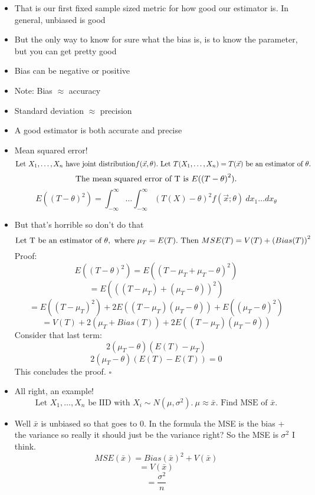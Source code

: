 \documentclass{article}
\begin{document}
\begin{itemize}
\[      \] 
    \item That is our first fixed sample sized metric for how good our estimator is. In general, unbiased is good
    \item But the only way to know for sure what the bias is, is to know the parameter, but you can get pretty good
    \item Bias can be negative or positive
    \item Note: Bias $ \approx $ accuracy
    \item Standard deviation  $ \approx $ precision
    \item A good estimator is both accurate and precise
    \item Mean squared error! 
       \[
         \textnormal{Let } X_1, \ldots, X_n \textnormal{ have joint distribution} f( \vec{x}, \theta). \textnormal{ Let } T(X_1, \ldots, X_n) = T( \vec{x}) \textnormal{ be an estimator of } \theta.
      \] 
      \[
        \textnormal{The mean squared error of T is } E( {(T - \theta)}^2).
      \] 
      \[
        E({(T - \theta)}^2) = \int_{-\infty}^\infty \ldots \int_{-\infty}^{\infty} {(T(X) - \theta)}^2 f(\vec{x}; \theta)~dx_1 \ldots dx_\theta
      \] 
    \item But that's horrible so don't do that
      \[
        \textnormal{Let T be an estimator of } \theta, \textnormal{ where } \mu_T = E(T). \text{ Then } MSE(T) = V(T) + {(Bias(T))}^2
      \] 
      Proof:
      \[
        E({(T - \theta)}^2) = E({(T - \mu_T + \mu_T - \theta)}^2)
      \] 
      \[
        = E({((T - \mu_T) + (\mu_T - \theta))}^2)
      \] 
      \[
        = E( {(T - \mu_T)}^2) + 2E( (T - \mu_T) (\mu_T - \theta )) + E({(\mu_T - \theta)}^2)
      \] 
      \[
        = V(T) + 2 (\mu_T + Bias(T)) + 2E ((T - \mu_T) (\mu_T - \theta))
      \]
      Consider that last term:
      \[
        2(\mu_T - \theta) (E(T) - \mu_T)
      \] 
      \[
        2 (\mu_T - \theta) (E(T) - E(T)) = 0
      \] 
      This concludes the proof. $ \square $

    \item All right, an example!
      \[
        \text{Let } X_1, \ldots, X_n \text{ be IID with } X_i\sim N(\mu, \sigma^2).~\mu \approx \bar{x}. \text{ Find MSE of } \bar{x}.
      \] 
    \item Well $ \bar{x} $ is unbiased so that goes to 0. In the formula the MSE is the bias + the variance so really it should just be the variance right? So the MSE is $ \sigma^2 $ I think.
       \[
         MSE( \bar{x}) = Bias {( \bar{x})}^2 + V( \bar{x})
      \] 
      \[
        = V( \bar{x})
      \] 
      \[
        = \frac{\sigma^2}{n}
      \] 
  \end{itemize}
\end{document}
